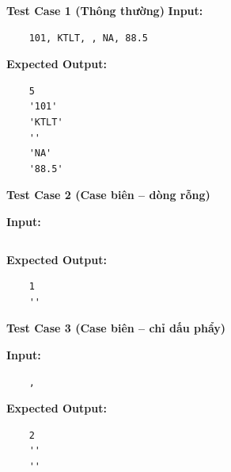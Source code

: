     \textbf{Test Case 1 (Thông thường)}
    \textbf{Input:}
    \begin{lstlisting}
    101, KTLT, , NA, 88.5\end{lstlisting}

    \textbf{Expected Output:}
    \begin{lstlisting}
    5
    '101'
    'KTLT'
    ''
    'NA'
    '88.5'\end{lstlisting}

    \vspace{0.5cm}

    \textbf{Test Case 2 (Case biên -- dòng rỗng)}

    \textbf{Input:}
    \begin{lstlisting}
    \end{lstlisting}

    \textbf{Expected Output:}
    \begin{lstlisting}
    1
    ''\end{lstlisting}

    \vspace{0.5cm}

    \textbf{Test Case 3 (Case biên -- chỉ dấu phẩy)}

    \textbf{Input:}
    \begin{lstlisting}
    ,\end{lstlisting}

    \textbf{Expected Output:}
    \begin{lstlisting}
    2
    ''
    ''\end{lstlisting}